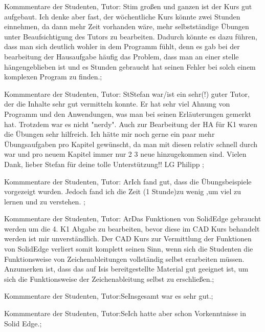 \documentclass[10pt]{beamer}
\begin{document}
\begin{frame}[fragile]{Kommmentare der Studenten, Tutor: St}im großen und ganzen ist der Kurs gut aufgebaut. Ich denke aber fast, der wöchentliche Kurs könnte zwei Stunden einnehmen, da dann mehr Zeit vorhanden wäre, mehr selbstständige Übungen unter Beaufsichtigung des Tutors zu bearbeiten. Dadurch könnte es dazu führen, dass man sich deutlich wohler in dem Programm fühlt, denn es gab bei der bearbeitung der Hausaufgabe häufig das Problem, dass man an einer stelle hängengeblieben ist und es Stunden gebraucht hat seinen Fehler bei solch einem komplexen Program zu finden.;
 \end{frame}
\begin{frame}[fragile]{Kommmentare der Studenten, Tutor: St}Stefan war/ist ein sehr(!) guter Tutor, der die Inhalte sehr gut vermitteln konnte. Er hat sehr viel Ahnung von Programm und den Anwendungen, was man bei seinen Erläuterungen gemerkt hat. Trotzdem war es nicht "nerdy". Auch zur Bearbeitung der HA für K1 waren die Übungen sehr hilfreich.  Ich hätte mir noch gerne ein paar mehr Übungsaufgaben pro Kapitel gewünscht, da man mit diesen relativ schnell durch war und pro neuem Kapitel immer nur 2 3 neue hinzugekommen sind. Vielen Dank, lieber Stefan für deine tolle Unterstützung!!  LG Philipp ;
 \end{frame}
\begin{frame}[fragile]{Kommmentare der Studenten, Tutor: Ar}Ich fand gut, dass die Übungsbeispiele vorgezeigt wurden. Jedoch fand ich die Zeit (1 Stunde)zu wenig ,um viel zu lernen und zu verstehen. ;
 \end{frame}
\begin{frame}[fragile]{Kommmentare der Studenten, Tutor: Ar}Das Funktionen von SolidEdge gebraucht werden um die 4. K1 Abgabe zu bearbeiten, bevor diese im CAD Kurs behandelt werden ist mir unverständlich.  Der CAD Kurs zur Vermittlung der Funktionen von SolidEdge verliert somit komplett seinen Sinn, wenn sich die Studenten die Funktionsweise von Zeichenableitungen vollständig selbst erarbeiten müssen.  Anzumerken ist, dass das auf Isis bereitgestellte Material gut geeignet ist, um sich die Funktionsweise der Zeichenableitung selbst zu erschließen.;
 \end{frame}
\begin{frame}[fragile]{Kommmentare der Studenten, Tutor:Se}Insgesamt war es sehr gut.;
 \end{frame}
\begin{frame}[fragile]{Kommmentare der Studenten, Tutor:Se}Ich hatte aber schon Vorkenntnisse in Solid Edge.;
 \end{frame}
\end{document}
